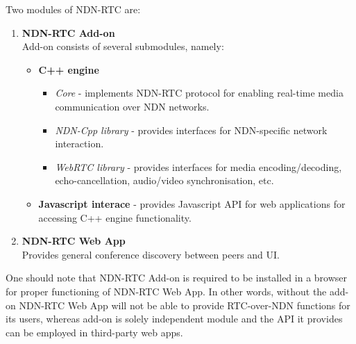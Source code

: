 \documentclass[12pt]{article}
\begin{document}
Two modules of NDN-RTC are: 
\begin{enumerate}
\item \textbf{NDN-RTC Add-on} \\
Add-on consists of several submodules, namely:
\begin{itemize}
\item \textbf{C++ engine}
\begin{itemize}
\item \textit{Core} - implements NDN-RTC protocol for enabling real-time media communication over NDN networks.
\item \textit{NDN-Cpp library} - provides interfaces for NDN-specific network interaction.
\item \textit{WebRTC library} - provides interfaces for media encoding/decoding, echo-cancellation, audio/video synchronisation, etc.
\end{itemize}
\item \textbf{Javascript interace} - provides Javascript API for web applications for accessing C++ engine functionality.  
\end{itemize}
\item \textbf{NDN-RTC Web App} \\
Provides general conference discovery between peers and UI.
\end{enumerate}

One should note that NDN-RTC Add-on is required to be installed in a browser for proper functioning of NDN-RTC Web App. In other words, without the add-on NDN-RTC Web App will not be able to provide RTC-over-NDN functions for its users, whereas add-on is solely independent module and the API it provides can be employed in third-party web apps. 
\end{document}
